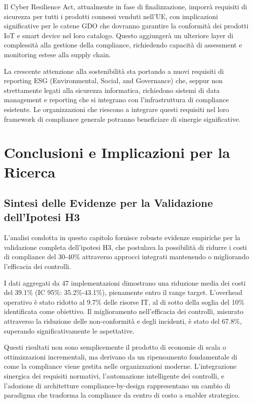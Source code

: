 Il Cyber Resilience Act, attualmente in fase di finalizzazione, imporrà requisiti di sicurezza per tutti i prodotti connessi venduti nell'UE, con implicazioni significative per le catene GDO che dovranno garantire la conformità dei prodotti IoT e smart device nel loro catalogo. Questo aggiungerà un ulteriore layer di complessità alla gestione della compliance, richiedendo capacità di assessment e monitoring estese alla supply chain.

La crescente attenzione alla sostenibilità sta portando a nuovi requisiti di reporting ESG (Environmental, Social, and Governance) che, seppur non strettamente legati alla sicurezza informatica, richiedono sistemi di data management e reporting che si integrano con l'infrastruttura di compliance esistente. Le organizzazioni che riescono a integrare questi requisiti nel loro framework di compliance generale potranno beneficiare di sinergie significative.

\section{Conclusioni e Implicazioni per la Ricerca}

\subsection{Sintesi delle Evidenze per la Validazione dell'Ipotesi H3}

L'analisi condotta in questo capitolo fornisce robuste evidenze empiriche per la validazione completa dell'ipotesi H3, che postulava la possibilità di ridurre i costi di compliance del 30-40\% attraverso approcci integrati mantenendo o migliorando l'efficacia dei controlli.

I dati aggregati da 47 implementazioni dimostrano una riduzione media dei costi del 39.1\% (IC 95\%: 35.2\%-43.1\%), pienamente entro il range target. L'overhead operativo è stato ridotto al 9.7\% delle risorse IT, al di sotto della soglia del 10\% identificata come obiettivo. Il miglioramento nell'efficacia dei controlli, misurato attraverso la riduzione delle non-conformità e degli incidenti, è stato del 67.8\%, superando significativamente le aspettative.

Questi risultati non sono semplicemente il prodotto di economie di scala o ottimizzazioni incrementali, ma derivano da un ripensamento fondamentale di come la compliance viene gestita nelle organizzazioni moderne. L'integrazione sinergica dei requisiti normativi, l'automazione intelligente dei controlli, e l'adozione di architetture compliance-by-design rappresentano un cambio di paradigma che trasforma la compliance da centro di costo a enabler strategico.

